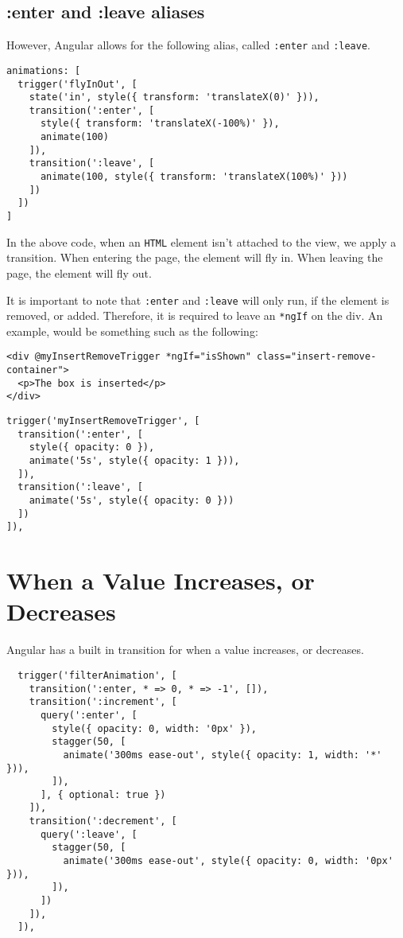 \subsection{ :enter and :leave aliases }

However, Angular allows for the following alias, called \lstinline{:enter} and
\lstinline{:leave}. 

\begin{lstlisting}
animations: [
  trigger('flyInOut', [
    state('in', style({ transform: 'translateX(0)' })),
    transition(':enter', [
      style({ transform: 'translateX(-100%)' }),
      animate(100)
    ]),
    transition(':leave', [
      animate(100, style({ transform: 'translateX(100%)' }))
    ])
  ])
]
\end{lstlisting}

In the above code, when an \lstinline{HTML} element isn't attached to the view, 
we apply a transition. When entering the page, the element will fly in. When 
leaving the page, the element will fly out. 

It is important to note that \lstinline{:enter} and \lstinline{:leave} will
only run, if the element is removed, or added. Therefore, it is required to 
leave an \lstinline{*ngIf} on the div. An example, would be something such as
the following: 
\begin{lstlisting}[caption=insert-remove.component.html]
<div @myInsertRemoveTrigger *ngIf="isShown" class="insert-remove-container">
  <p>The box is inserted</p>
</div>  
\end{lstlisting}

\begin{lstlisting}[caption=insert-remove.component.ts]
trigger('myInsertRemoveTrigger', [
  transition(':enter', [
    style({ opacity: 0 }),
    animate('5s', style({ opacity: 1 })),
  ]),
  transition(':leave', [
    animate('5s', style({ opacity: 0 }))
  ])
]),  
\end{lstlisting}


\section{When a Value Increases, or Decreases}
Angular has a built in transition for when a value increases, or decreases. 
\begin{lstlisting}
  trigger('filterAnimation', [
    transition(':enter, * => 0, * => -1', []),
    transition(':increment', [
      query(':enter', [
        style({ opacity: 0, width: '0px' }),
        stagger(50, [
          animate('300ms ease-out', style({ opacity: 1, width: '*' })),
        ]),
      ], { optional: true })
    ]),
    transition(':decrement', [
      query(':leave', [
        stagger(50, [
          animate('300ms ease-out', style({ opacity: 0, width: '0px' })),
        ]),
      ])
    ]),
  ]),  
\end{lstlisting}


